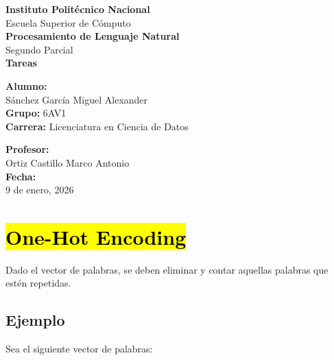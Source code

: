 \documentclass[12pt]{article}
\begin{document}
\thispagestyle{empty}

\begin{center}

{\LARGE \textbf{Instituto Politécnico Nacional}}\\[0.5cm]
{\large Escuela Superior de Cómputo}\\[1.5cm]



{\Huge \textbf{Procesamiento de Lenguaje Natural}}\\[0.5cm]
{\large Segundo Parcial}\\[2cm]

{\LARGE \textbf{Tareas}}\\[0.5cm]

\end{center}

\vfill

\begin{minipage}{0.55\textwidth}
\textbf{Alumno:}\\
Sánchez García Miguel Alexander\\[1cm]

\textbf{Grupo:} 6AV1\\
\textbf{Carrera:} Licenciatura en Ciencia de Datos
\end{minipage}
\hfill
\begin{minipage}{0.35\textwidth}
\textbf{Profesor:}\\
Ortiz Castillo Marco Antonio\\[1cm]

\textbf{Fecha:}\\
9 de enero, 2026
\end{minipage}

\newpage



\section*{\hl{One-Hot Encoding}}

Dado el vector de palabras, se deben eliminar y contar aquellas palabras que estén repetidas.

\subsection*{Ejemplo}

Sea el siguiente vector de palabras:
\end{document}
